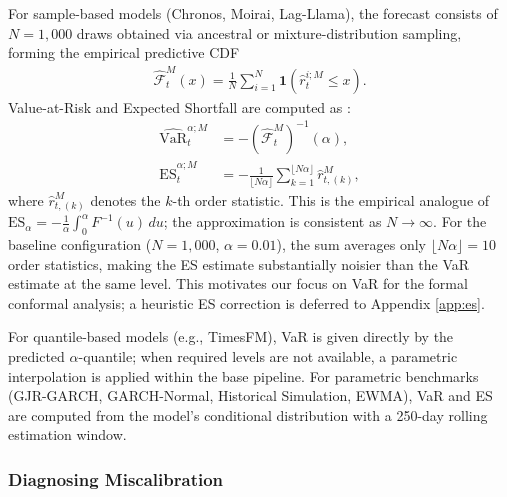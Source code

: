 \documentclass[preprint,11pt,authoryear]{elsarticle}
\newcommand{\VaR}{\mathrm{VaR}}
\newcommand{\ES}{\mathrm{ES}}
\newcommand{\1}{\boldsymbol{1}}
\newcommand{\Fhat}{\hat{\mathcal{F}}}
\begin{document}
	For sample-based models (Chronos,
	Moirai, Lag-Llama), the forecast consists of $N=1{,}000$ draws
	obtained via ancestral or mixture-distribution sampling,
	forming the empirical predictive CDF
	\begin{align}
		\Fhat_t^M(x) = \frac{1}{N}\sum_{i=1}^{N}
		\1(\hat{r}_t^{i;M}\leq x).
	\end{align}
	Value-at-Risk and Expected Shortfall are computed as
	\citep{pele2025llmvar}:
	\begin{align}
		\widehat{\VaR}_t^{\alpha;M}
		&= -(\Fhat_t^M)^{-1}(\alpha), \\
		\widehat{\ES}_t^{\alpha;M}
		&= -\frac{1}{\lfloor N\alpha\rfloor}
		\sum_{k=1}^{\lfloor N\alpha\rfloor}\hat{r}_{t,(k)}^M,
	\end{align}
	where $\hat{r}_{t,(k)}^M$ denotes the $k$-th order statistic.
	This is the empirical analogue of
	$\ES_\alpha = -\frac{1}{\alpha}\int_0^\alpha F^{-1}(u)\,du$;
	the approximation is consistent as $N \to \infty$.
	For the baseline configuration ($N = 1{,}000$,
	$\alpha = 0.01$), the sum averages only
	$\lfloor N\alpha \rfloor = 10$ order statistics, making
	the ES estimate substantially noisier than the VaR
	estimate at the same level. This motivates our focus
	on VaR for the formal conformal analysis; a heuristic
	ES correction is deferred to Appendix \ref{app:es}.
	
	For quantile-based models (e.g., TimesFM), VaR is given
	directly by the predicted $\alpha$-quantile; when required
	levels are not available, a parametric interpolation is applied
	within the base pipeline. For parametric benchmarks
	(GJR-GARCH, GARCH-Normal, Historical Simulation, EWMA), VaR
	and ES are computed from the model's conditional distribution
	with a 250-day rolling estimation window.
	
	\subsubsection{Diagnosing Miscalibration}
	\label{sec:diag}
	
\end{document}
